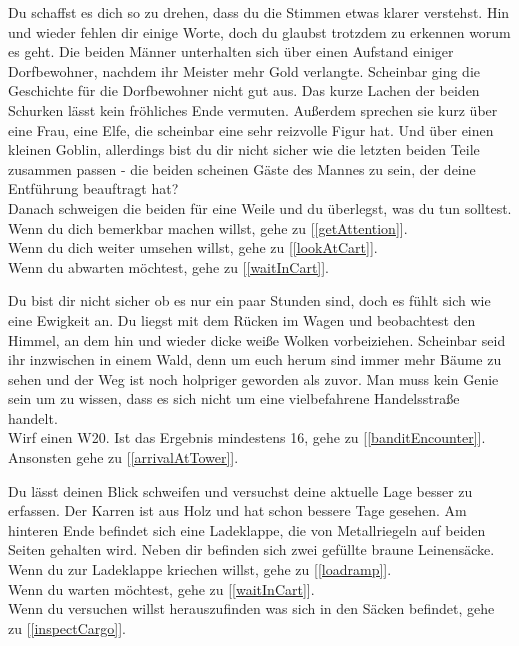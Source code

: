 Du schaffst es dich so zu drehen, dass du die Stimmen etwas klarer verstehst. Hin und wieder fehlen dir einige Worte, doch du glaubst trotzdem zu erkennen worum es geht. Die beiden Männer unterhalten sich über einen Aufstand einiger Dorfbewohner, nachdem ihr Meister mehr Gold verlangte. Scheinbar ging die Geschichte für die Dorfbewohner nicht gut aus. Das kurze Lachen der beiden Schurken lässt kein fröhliches Ende vermuten. Außerdem sprechen sie kurz über eine Frau, eine Elfe, die scheinbar eine sehr reizvolle Figur hat. Und über einen kleinen Goblin, allerdings bist du dir nicht sicher wie die letzten beiden Teile zusammen passen - die beiden scheinen Gäste des Mannes zu sein, der deine Entführung beauftragt hat?\\
Danach schweigen die beiden für eine Weile und du überlegst, was du tun solltest.
\\Wenn du dich bemerkbar machen willst, gehe zu [\ref{getAttention}].
\\Wenn du dich weiter umsehen willst, gehe zu [\ref{lookAtCart}].
\\Wenn du abwarten möchtest, gehe zu [\ref{waitInCart}].


Du bist dir nicht sicher ob es nur ein paar Stunden sind, doch es fühlt sich wie eine Ewigkeit an. Du liegst mit dem Rücken im Wagen und beobachtest den Himmel, an dem hin und wieder dicke weiße Wolken vorbeiziehen. Scheinbar seid ihr inzwischen in einem Wald, denn um euch herum sind immer mehr Bäume zu sehen und der Weg ist noch holpriger geworden als zuvor. Man muss kein Genie sein um zu wissen, dass es sich nicht um eine vielbefahrene Handelsstraße handelt.\\
Wirf einen W20. Ist das Ergebnis mindestens 16, gehe zu [\ref{banditEncounter}].\\
Ansonsten gehe zu [\ref{arrivalAtTower}].


Du lässt deinen Blick schweifen und versuchst deine aktuelle Lage besser zu erfassen. Der Karren ist aus Holz und hat schon bessere Tage gesehen. Am hinteren Ende befindet sich eine Ladeklappe, die von Metallriegeln auf beiden Seiten gehalten wird. Neben dir befinden sich zwei gefüllte braune Leinensäcke.
\\Wenn du zur Ladeklappe kriechen willst, gehe zu [\ref{loadramp}].
\\Wenn du warten möchtest, gehe zu [\ref{waitInCart}].
\\Wenn du versuchen willst herauszufinden was sich in den Säcken befindet, gehe zu [\ref{inspectCargo}].

